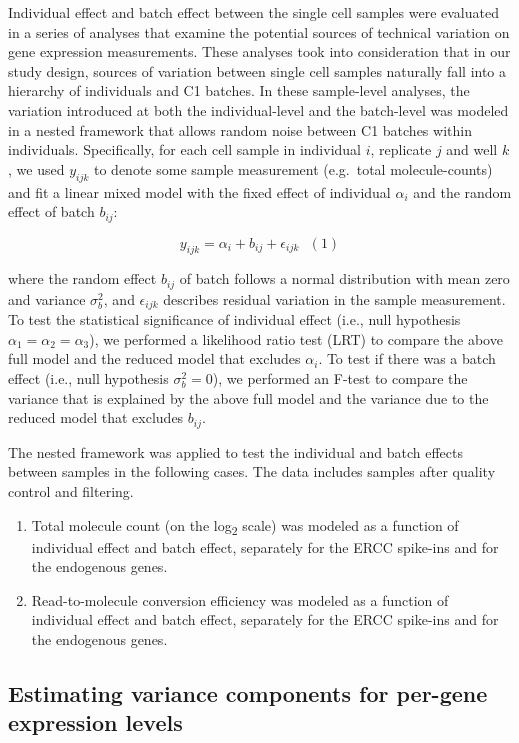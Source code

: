 Individual effect and batch effect between the single cell samples
were evaluated in a series of analyses that examine the potential
sources of technical variation on gene expression measurements. These
analyses took into consideration that in our study design, sources of
variation between single cell samples naturally fall into a hierarchy
of individuals and C1 batches. In these sample-level analyses, the
variation introduced at both the individual-level and the batch-level
was modeled in a nested framework that allows random noise between C1
batches within individuals. Specifically, for each cell sample in
individual $i$, replicate $j$ and well $k$, we used $y_{ijk}$ to
denote some sample measurement (e.g.~total molecule-counts) and fit a
linear mixed model with the fixed effect of individual $\alpha_i$ and
the random effect of batch $b_{ij}$:

\[y_{ijk} = \alpha_{i} + b_{ij} + \epsilon_{ijk} \,\,\,\,(1)\]

where the random effect $b_{ij}$ of batch follows a normal
distribution with mean zero and variance $\sigma^2_{b}$, and
$\epsilon_{ijk}$ describes residual variation in the sample
measurement. To test the statistical significance of individual effect
(i.e., null hypothesis $\alpha_1 = \alpha_2 = \alpha_3$), we performed
a likelihood ratio test (LRT) to compare the above full model and the
reduced model that excludes $\alpha_i$. To test if there was a batch
effect (i.e., null hypothesis $\sigma^2_b = 0$), we performed an
F-test to compare the variance that is explained by the above full
model and the variance due to the reduced model that excludes
$b_{ij}$.

The nested framework was applied to test the individual and batch
effects between samples in the following cases. The data includes
samples after quality control and filtering.

\begin{enumerate}
\def\labelenumi{\arabic{enumi}.}
\item
  Total molecule count (on the log\textsubscript{2} scale) was modeled
  as a function of individual effect and batch effect, separately for
  the ERCC spike-ins and for the endogenous genes.
\item
  Read-to-molecule conversion efficiency was modeled as a function of
  individual effect and batch effect, separately for the ERCC
  spike-ins and for the endogenous genes.
\end{enumerate}

\subsection{Estimating variance components for per-gene expression
levels}\label{estimating-variance-components-for-per-gene-expression-levels}

